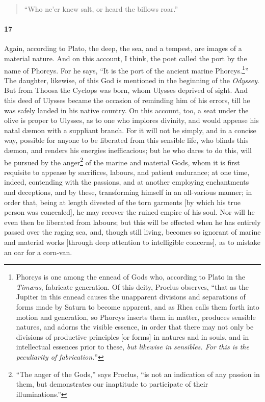\documentclass[12pt]{article}
\begin{document}
\begin{verse}
``Who ne'er knew salt, or heard the billows roar.''
\end{verse}


\paragraph{17} Again, according to Plato, the deep, the sea, and a tempest, are
images of a material nature. And on this account, I think, the poet called the
port by the name of Phorcys. For he says, ``It is the port of the ancient
marine Phorcys.\footnote{Phorcys is one among the ennead of Gods who, according
to Plato in the \textit{Tim{\ae}us}, fabricate generation. Of this deity,
Proclus observes, ``that as the Jupiter in this ennead causes the unapparent
divisions and separations of forms made by Saturn to become apparent, and as
Rhea calls them forth into motion and generation, so Phorcys inserts them in
matter, produces sensible natures, and adorns the visible essence, in order
that there may not only be divisions of productive principles [or forms] in
natures and in souls, and in intellectual essences prior to these, \textit{but
likewise in sensibles. For this is the peculiarity of fabrication.}''}'' The
daughter, likewise, of this God is mentioned in the beginning of the
\textit{Odyssey}.  But from Thoosa the Cyclops was born, whom Ulysses deprived
of sight. And this deed of Ulysses became the occasion of reminding him of his
errors, till he was safely landed in his native country. On this account, too,
a seat under the olive is proper to Ulysses, as to one who implores divinity,
and would appease his natal d{\ae}mon with a suppliant branch. For it will not
be simply, and in a concise way, possible for anyone to be liberated from this
sensible life, who blinds this d{\ae}mon, and renders his energies
inefficacious; but he who dares to do this, will be pursued by the
anger\footnote{\-``The anger of the Gods,'' says Proclus, ``is not an
indication of any passion in them, but demonstrates our inaptitude to
participate of their illuminations.''} of the marine and material Gods, whom it
is first requisite to appease by sacrifices, labours, and patient endurance; at
one time, indeed, contending with the passions, and at another employing
enchantments and deceptions, and by these, transforming himself in an
all-various manner; in order that, being at length divested of the torn
garments [by which his true person was concealed], he may recover the ruined
empire of his soul. Nor will he even then be liberated from labours; but this
will be effected when he has entirely passed over the raging sea, and, though
still living, becomes so ignorant of marine and material works [through deep
attention to intelligible concerns], as to mistake an oar for a corn-van.
\end{document}
